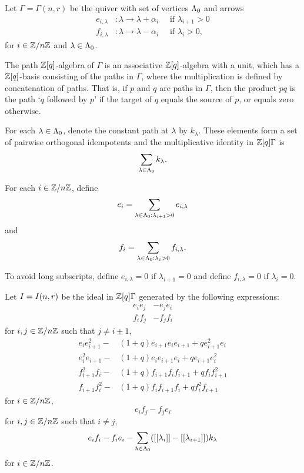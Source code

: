 \documentclass[a4paper, 11pt, twoside]{report}
\begin{document}
Let $\Gamma=\Gamma(n,r)$ be the quiver with set of vertices $\Lambda_0{}$ and arrows
\begin{align*}
e_{i,\lambda}&\colon\lambda\to\lambda+\alpha_i \quad\text{ if } \lambda_{i+1}>0\\
f_{i,\lambda}&\colon\lambda\to\lambda-\alpha_i \quad\text{ if } \lambda_i>0,
\end{align*}
for $i\in\mathbb{Z}/{n \mathbb{Z}}$ and $\lambda\in\Lambda_0{}$.

The path $\mathbb{Z}[q]$-algebra of $\Gamma$ is an associative $\mathbb{Z}[q]$-algebra with a unit, which has a $\mathbb{Z}[q]$-basis consisting of the paths in $\Gamma$, where the multiplication is defined by concatenation of paths. That is, if $p$ and $q$ are paths in $\Gamma$, then the product $pq$ is the path `$q$ followed by $p$' if the target of $q$ equals the source of $p$, or equals zero otherwise. 

For each $\lambda\in\Lambda_0{}$, denote the constant path at $\lambda$ by $k_\lambda$. These elements form a set of pairwise orthogonal idempotents and the multiplicative identity in $\mathbb{Z}[q]\Gamma$ is
\begin{equation*}
\sum_{\lambda\in\Lambda_0{}} k_\lambda.
\end{equation*}

For each $i\in\mathbb{Z}/{n \mathbb{Z}}$, define
\begin{equation*}
e_i = \sum_{\lambda\in\Lambda_0{}:\lambda_{i+1}>0} e_{i,\lambda}
\end{equation*}
and
\begin{equation*}
f_i = \sum_{\lambda\in\Lambda_0{}: \lambda_i>0} f_{i,\lambda}.
\end{equation*}

To avoid long subscripts, define $e_{i,\lambda}=0$ if $\lambda_{i+1}=0$ and define $f_{i,\lambda}=0$ if $\lambda_i=0$.

Let $I=I(n,r)$ be the ideal in $\mathbb{Z}[q]\Gamma$ generated by the following expressions:
\begin{align*}
e_ie_j &-e_je_i\\
f_if_j &-f_jf_i
\end{align*}
for $i,j\in\mathbb{Z}/{n \mathbb{Z}}$ such that $j\neq i\pm 1$,
\begin{align*}
e_ie_{i+1}^2 -&(1+q)e_{i+1}e_ie_{i+1} +qe_{i+1}^2e_i\\
e_i^2e_{i+1} -&(1+q)e_ie_{i+1}e_i +qe_{i+1}e_i^2\\
f_{i+1}^2f_i -&(1+q)f_{i+1}f_if_{i+1} +qf_if_{i+1}^2\\
f_{i+1}f_i^2 -&(1+q)f_if_{i+1}f_i +qf_i^2f_{i+1}
\end{align*}
for $i\in\mathbb{Z}/{n \mathbb{Z}}$,
\begin{equation*}
e_if_j-f_je_i
\end{equation*}
for $i,j\in\mathbb{Z}/{n \mathbb{Z}}$ such that $i\neq j$,
\begin{equation*}
e_if_i-f_ie_i - \sum_{\lambda\in\Lambda_0{}}([[\lambda_i]]-[[\lambda_{i+1}]])k_\lambda
\end{equation*}
for $i\in\mathbb{Z}/{n \mathbb{Z}}$.
\end{document}
